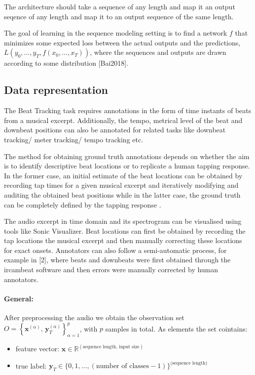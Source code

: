 \documentclass{article}
\begin{document}
The architecture should take a sequence of any length and map it an output seqence of any length and map it to an output sequence of the same length.

The goal of learning in the sequence modeling setting is to find a network $f$ that minimizes some expected loss between the actual outputs and the predictions, $L(y_0,\dots,y_T, f(x_0,\dots,x_T))$, where the sequences and outputs are drawn according to some distribution [Bai2018].



\subsection{Data representation}


The Beat Tracking task requires annotations in the form of time instants of beats from a musical excerpt. Additionally, the tempo, metrical level of the beat and downbeat positions can also be annotated for related tasks like downbeat tracking/ meter tracking/ tempo tracking etc.

The method for obtaining ground truth annotations depends on whether the aim is to identify descriptive beat locations or to replicate a human tapping response. In the former case, an initial estimate of the beat locations can be obtained by recording tap times for a given musical excerpt and iteratively modifying and auditing the obtained beat positions while in the latter case, the ground truth can be completely defined by the tapping response \cite{Davies2009b}.

The audio excerpt in time domain and its spectrogram can be visualised using tools like Sonic Visualizer. Beat locations can first be obtained by recording the tap locations the musical excerpt and then manually correcting these locations for exact onsets.  Annotators can also follow a semi-automatic process, for example in [2], where beats and downbeats were first obtained through the ircambeat software and then errors were manually corrected by human annotators.



\paragraph{General:}

After preprocessing the audio we obtain the observation set $ O = \left\{ \mathbf x^{(\alpha)}, \,\mathbf y_T^{(\alpha)} \right \}_{\alpha = 1}^p$, with $p$ samples in total. As elements the set cointains:
\begin{itemize}
\item feature vector: $\mathbf x \in \mathbb R^{(\text{sequence length}, \,\text{input size})}$
\item true label: $\mathbf y_T \in \{0,1, \dots, (\text{number of classes}-1)\}^{\text{(sequence length)}}$
\end{itemize}
\end{document}
